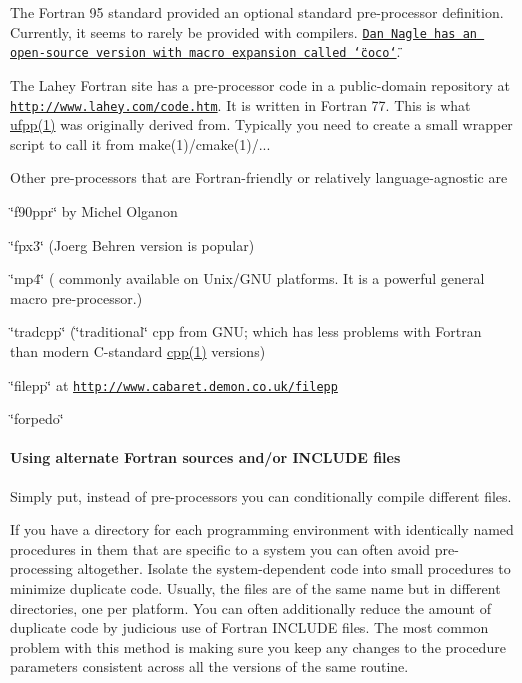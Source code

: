 The Fortran 95 standard provided an optional standard pre-\/processor definition. Currently, it seems to rarely be provided with compilers. \href{http://www.daniellnagle.com/coco.html}{\tt Dan Nagle has an open-\/source version with macro expansion called \char`\"{}coco\char`\"{}}. 

The Lahey Fortran site has a pre-\/processor code in a public-\/domain repository at \href{http://www.lahey.com/code.htm}{\tt http\+://www.\+lahey.\+com/code.\+htm}. It is written in Fortran 77. This is what \hyperlink{ufpp__overview_81_8txt_a97c20a96bcab81bc74c9d64b001f1202}{ufpp(1)} was originally derived from. Typically you need to create a small wrapper script to call it from make(1)/cmake(1)/... 

Other pre-\/processors that are Fortran-\/friendly or relatively language-\/agnostic are 
\begin{DoxyItemize}
\item \char`\"{}f90ppr\char`\"{} by Michel Olganon 
\item \char`\"{}fpx3\char`\"{} (Joerg Behren version is popular)  
\item \char`\"{}mp4\char`\"{} ( commonly available on Unix/\+G\+NU platforms. It is a powerful general macro pre-\/processor.) 
\item \char`\"{}tradcpp\char`\"{} (\char`\"{}traditional\char`\"{} cpp from G\+NU; which has less problems with Fortran than modern C-\/standard \hyperlink{ufpp__overview_81_8txt_ad80405d1dd53db5cd0aa7a8cc7e457a3}{cpp(1)} versions) 
\item \char`\"{}filepp\char`\"{} at \href{http://www.cabaret.demon.co.uk/filepp}{\tt http\+://www.\+cabaret.\+demon.\+co.\+uk/filepp} 
\item \char`\"{}forpedo\char`\"{} 
\end{DoxyItemize}

\paragraph*{Using alternate Fortran sources and/or I\+N\+C\+L\+U\+DE files }

Simply put, instead of pre-\/processors you can conditionally compile different files. 

If you have a directory for each programming environment with identically named procedures in them that are specific to a system you can often avoid pre-\/processing altogether. Isolate the system-\/dependent code into small procedures to minimize duplicate code. Usually, the files are of the same name but in different directories, one per platform. You can often additionally reduce the amount of duplicate code by judicious use of Fortran I\+N\+C\+L\+U\+DE files. The most common problem with this method is making sure you keep any changes to the procedure parameters consistent across all the versions of the same routine. 


